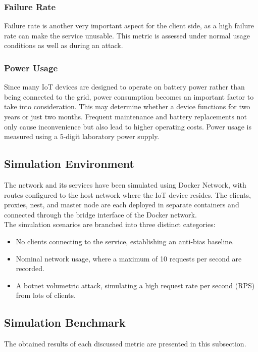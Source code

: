 \documentclass[conference]{IEEEtran}
\begin{document}
\subsubsection{Failure Rate}
Failure rate is another very important aspect for the client side, as a high failure rate can make the service unusable. This metric is assessed under normal usage conditions as well as during an attack.
\subsubsection{Power Usage}
Since many IoT devices are designed to operate on battery power rather than being connected to the grid, power consumption becomes an important factor to take into consideration. This may determine whether a device functions for two years or just two months. Frequent maintenance and battery replacements not only cause inconvenience but also lead to higher operating costs. Power usage is measured using a 5-digit laboratory power supply.

\subsection{Simulation Environment}
The network and its services have been simulated using Docker Network, with routes configured to the host network where the IoT device resides. The clients, proxies, nest, and master node are each deployed in separate containers and connected through the bridge interface of the Docker network.\\

The simulation scenarios are branched into three distinct categories:
\begin{itemize}
    \item No clients connecting to the service, establishing an anti-bias baseline.
    \item Nominal network usage, where a maximum of 10 requests per second are recorded.
    \item A botnet volumetric attack, simulating a high request rate per second (RPS) from lots of clients. 
\end{itemize}


\subsection{Simulation Benchmark}
The obtained results of each discussed metric are presented in this subsection. \\
\end{document}
